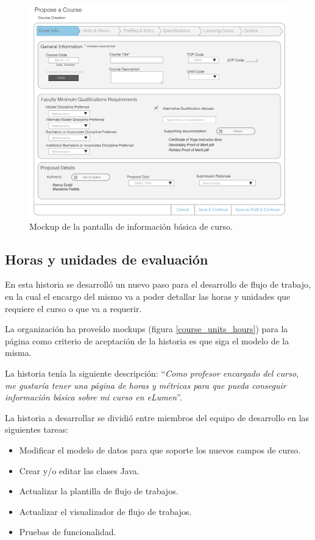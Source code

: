 \begin{figure}[H]
\centering
\includegraphics[scale=0.3]{Capitulos/DesarrollodelaAplicacion/Imagenes/course_cover_info}
\caption{Mockup de la pantalla de información básica de curso.}
  \label{course_cover_info}
\end{figure}

\subsection{Horas y unidades de evaluación}
En esta historia se desarrolló un nuevo paso para el desarrollo de flujo de trabajo, en la cual el encargo del mismo va a poder detallar las horas y unidades que requiere el curso o que va a requerir.

La organización ha proveído mockups (figura \ref{course_units_hours}) para la página como criterio de aceptación de la historia es que siga el modelo de la misma.

La historia tenía la siguiente descripción: \enquote{\textit{Como profesor encargado del curso, me gustaría tener una página de horas y métricas para que pueda conseguir información básica sobre mi curso en eLumen}}.

La historia a desarrollar se dividió entre miembros del equipo de desarrollo en las siguientes tareas:
\begin{itemize}
	\item Modificar el modelo de datos para que soporte los nuevos campos de curso.
	\item Crear y/o editar las clases Java.
	\item Actualizar la plantilla de flujo de trabajos.
	\item Actualizar el visualizador de flujo de trabajos.
	\item Pruebas de funcionalidad.
\end{itemize}

